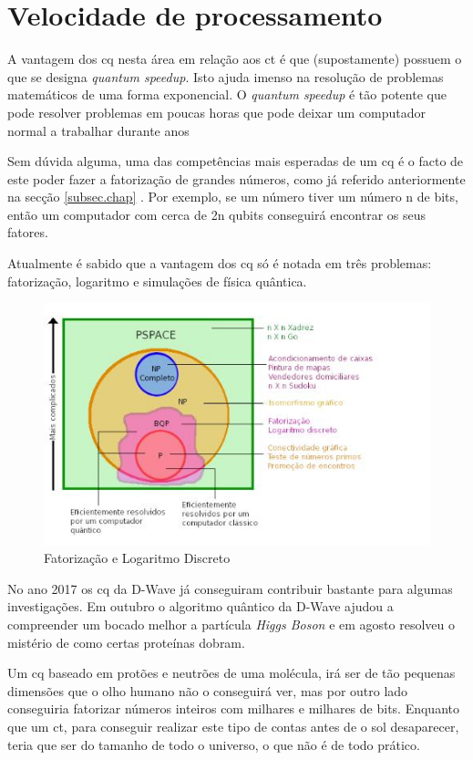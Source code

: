 \documentclass{report}
\begin{document}
\section{Velocidade de processamento}
	A vantagem dos \ac{cq} nesta área em relação aos \ac{ct} é que (supostamente) possuem o que se designa \emph{quantum speedup}. Isto ajuda imenso na resolução de problemas matemáticos de uma forma exponencial. O \emph{quantum speedup} é tão potente que pode resolver problemas em poucas horas que pode deixar um computador normal a trabalhar durante anos
	
	Sem dúvida alguma, uma das competências mais esperadas de um \ac{cq} é o facto de este poder fazer a fatorização de grandes números, como já referido anteriormente na secção \ref{subsec.chap} . Por exemplo, se um número tiver um número n de bits, então um computador com cerca de 2n qubits conseguirá encontrar os seus fatores. 
	
\newpage
	
	Atualmente é sabido que a vantagem dos \ac{cq} só é notada em três problemas: fatorização, logaritmo e simulações de física quântica.
	
\begin{figure}[!h]
	\centering
	\includegraphics[scale=0.3]{potencial.jpg} 
	\caption{Fatorização e Logaritmo Discreto}
	\label{potencial}
		
\end{figure}	

	No ano 2017 os \ac{cq} da D-Wave já conseguiram contribuir bastante para algumas investigações. Em outubro o algoritmo quântico da D-Wave ajudou a compreender um bocado melhor a partícula \emph{Higgs Boson} e em agosto resolveu o mistério de como certas proteínas dobram.
		
	Um \ac{cq} baseado em protões e neutrões de uma molécula, irá ser de tão pequenas dimensões que o olho humano não o conseguirá ver, mas por outro lado conseguiria fatorizar números inteiros com milhares e milhares de bits. Enquanto que um \ac{ct}, para conseguir realizar este tipo de contas antes de o sol desaparecer, teria que ser do tamanho de todo o universo, o que não é de todo prático.
\end{document}
